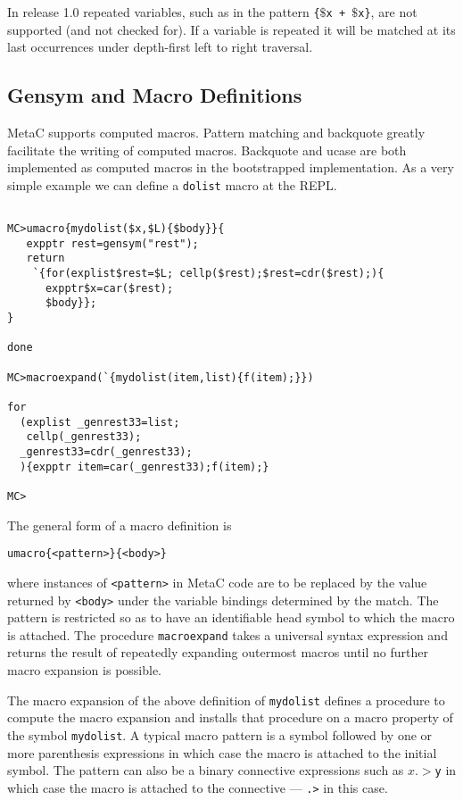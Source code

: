 \documentclass{article}
\begin{document}
In release 1.0 repeated variables, such as in the pattern {\tt \{$\$$x + $\$$x\}}, are not supported (and not checked for).
If a variable is repeated it will be matched at its last occurrences under depth-first left to right traversal.

\subsection{Gensym and Macro Definitions}

MetaC supports computed macros.  Pattern matching and backquote greatly facilitate the writing of computed macros.  Backquote and ucase are both implemented as computed macros in the bootstrapped implementation. As a very simple example we can define a {\tt dolist} macro at the REPL.

\begin{verbatim}

MC>umacro{mydolist($x,$L){$body}}{
   expptr rest=gensym("rest");
   return
    `{for(explist$rest=$L; cellp($rest);$rest=cdr($rest);){
      expptr$x=car($rest);
      $body}};
}

done

MC>macroexpand(`{mydolist(item,list){f(item);}})

for
  (explist _genrest33=list;
   cellp(_genrest33);
  _genrest33=cdr(_genrest33);
  ){expptr item=car(_genrest33);f(item);}

MC>
\end{verbatim}

The general form of a macro definition is
\begin{verbatim}
umacro{<pattern>}{<body>}
\end{verbatim}
where instances of {\tt <pattern>} in MetaC code are to be replaced by
the value returned by {\tt <body>} under the variable bindings
determined by the match.  The pattern is restricted so as to have
an identifiable head symbol to which the macro is attached.
The procedure {\tt macroexpand} takes a
universal syntax expression and returns the result of repeatedly
expanding outermost macros until no further macro expansion is
possible.

The macro expansion of the above definition of {\tt mydolist}
defines a procedure
to compute the macro expansion and installs that procedure on a macro
property of the symbol {\tt mydolist}.  A typical macro pattern
is a symbol followed by one or more parenthesis
expressions in which case the macro is attached to the initial symbol.
The pattern can also be
a binary connective expressions such as {\tt {$x .> $y}} in which case
the macro is attached to the connective --- {\tt .>} in this case.
\end{document}
